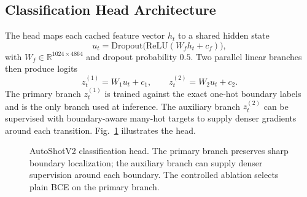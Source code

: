 \subsection{Classification Head Architecture}
\label{sec:head}

The head maps each cached feature vector $h_t$ to a shared hidden state
\begin{equation}
    u_t = \mathrm{Dropout}\bigl(\mathrm{ReLU}(W_f h_t + c_f)\bigr),
    \label{eq:hidden}
\end{equation}
with $W_f\in\mathbb{R}^{1024\times4864}$ and dropout probability $0.5$. Two
parallel linear branches then produce logits
\begin{equation}
    z^{(1)}_t = W_1 u_t + c_1, \qquad z^{(2)}_t = W_2 u_t + c_2.
    \label{eq:branches}
\end{equation}
The primary branch $z^{(1)}_t$ is trained against the exact one-hot boundary
labels and is the only branch used at inference. The auxiliary branch
$z^{(2)}_t$ can be supervised with boundary-aware many-hot targets to supply
denser gradients around each transition. Fig.~\ref{fig:head} illustrates
the head.

\begin{figure}[!t]
\centering
{}
\caption{AutoShotV2 classification head. The primary branch preserves sharp
boundary localization; the auxiliary branch can supply denser supervision
around each boundary. The controlled ablation selects plain BCE on the
primary branch.}
\label{fig:head}
\end{figure}

